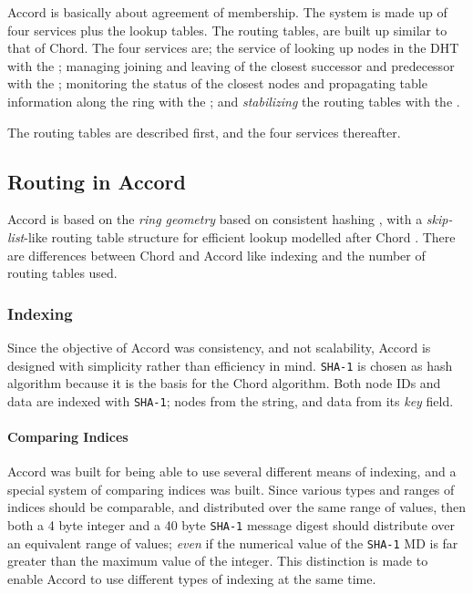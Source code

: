 Accord is basically about agreement of membership. The system is made up
 of four services plus the lookup tables. The routing tables, are built up
 similar to that of Chord\cite{stoica-01-chord}. The four services are;
 the service of looking up nodes in the DHT with the
 ; managing joining and leaving of the closest successor
 and predecessor with the ; monitoring the status
 of the closest nodes and propagating table information along the ring with the
 ; and \emph{stabilizing} the routing tables with the
 .

The routing tables are described first, and the four services thereafter.

\subsection{Routing in Accord}

Accord is based on the \emph{ring geometry} based on consistent
 hashing \cite{karger-97-consistent-hashing}, with a \emph{skip-list}-like
 routing table structure for efficient lookup
 modelled after Chord \cite{stoica-01-chord}. There are differences between
 Chord and Accord like indexing and the number of routing tables used.

\subsubsection{Indexing}
\label{design:indexing}

Since the objective of Accord was consistency, and not scalability, Accord is designed
 with simplicity rather than efficiency in mind. {\tt SHA-1}\cite{sha-1} is chosen as hash
 algorithm because it is the basis for the Chord algorithm\cite{stoica-01-chord}. Both
 node IDs and data are indexed with {\tt SHA-1}; nodes from the  string,
 and data from its \emph{key} field.

\paragraph{Comparing Indices} Accord was built for being able to use several different
 means of indexing, and a special system of comparing indices was built. Since various
 types and ranges of indices should be comparable, and distributed over the same
 range of values, then both a 4 byte integer and a 40 byte {\tt SHA-1} message digest should
 distribute over an equivalent range of values; \emph{even} if the numerical value of
 the {\tt SHA-1} MD is far greater than
 the maximum value of the integer. This distinction is made to enable Accord to use
 different types of indexing at the same time.

